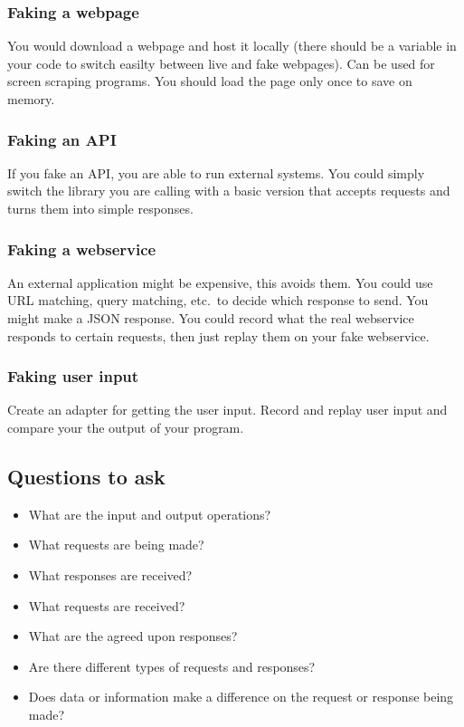 \subsubsection{Faking a webpage}\label{ssub:faking_a_webpage}

You would download a webpage and host it locally (there should be a variable in your code to switch easilty between live and fake webpages).
Can be used for screen scraping programs.
You should load the page only once to save on memory.

\subsubsection{Faking an API}\label{ssub:faking_an_api}

If you fake an API, you are able to run external systems.
You could simply switch the library you are calling with a basic version that accepts requests and turns them into simple responses.

\subsubsection{Faking a webservice}\label{ssub:faking_a_webservice}

An external application might be expensive, this avoids them.
You could use URL matching, query matching, etc.\ to decide which response to send.
You might make a JSON response.
You could record what the real webservice responds to certain requests, then just replay them on your fake webservice.

\subsubsection{Faking user input}\label{ssub:faking_user_input}

Create an adapter for getting the user input.
Record and replay user input and compare your the output of your program.

\subsection{Questions to ask}\label{sub:questions_to_ask}

\begin{itemize}
	\item What are the input and output operations?
	\item What requests are being made?
	\item What responses are received?
	\item What requests are received?
	\item What are the agreed upon responses?
	\item Are there different types of requests and responses?
	\item Does data or information make a difference on the request or response being made?
\end{itemize}
